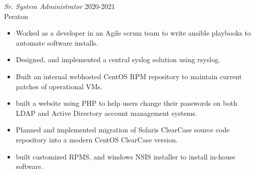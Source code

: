 \documentclass[margin, 10pt]{res} %
\begin{document}
\begin{resume}
{\sl Sr. System Administrator } \hfill 2020-2021 \\
Peraton
\begin{itemize}
  \item Worked as a developer in an Agile scrum team to write ansible playbooks to automate software installs.
  \item Designed, and implemented a central syslog solution using rsyslog.
  \item Built an internal webhosted CentOS RPM repository to maintain current patches of operational VMs.
  \item built a website using PHP to help users change their passwords on both LDAP and Active Directory account management systems.
  \item Planned and implemented migration of Solaris ClearCase source code repository into a modern CentOS ClearCase version.
  \item built customized RPMS, and windows NSIS installer to install in-house software.
\end{itemize}


\end{resume}
\end{document}

